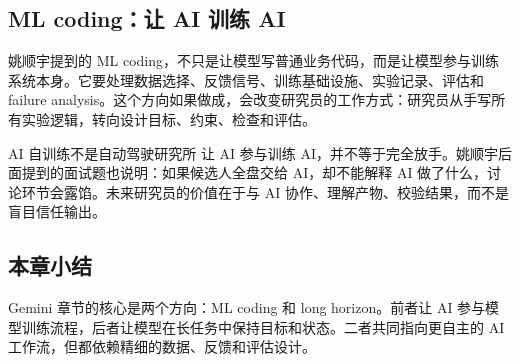 \subsection{ML coding：让 AI 训练 AI}

姚顺宇提到的 ML coding，不只是让模型写普通业务代码，而是让模型参与训练系统本身。它要处理数据选择、反馈信号、训练基础设施、实验记录、评估和 failure analysis。这个方向如果做成，会改变研究员的工作方式：研究员从手写所有实验逻辑，转向设计目标、约束、检查和评估。

\begin{warningbox}{AI 自训练不是自动驾驶研究所}
让 AI 参与训练 AI，并不等于完全放手。姚顺宇后面提到的面试题也说明：如果候选人全盘交给 AI，却不能解释 AI 做了什么，讨论环节会露馅。未来研究员的价值在于与 AI 协作、理解产物、校验结果，而不是盲目信任输出。
\end{warningbox}

\subsection{本章小结}

Gemini 章节的核心是两个方向：ML coding 和 long horizon。前者让 AI 参与模型训练流程，后者让模型在长任务中保持目标和状态。二者共同指向更自主的 AI 工作流，但都依赖精细的数据、反馈和评估设计。

